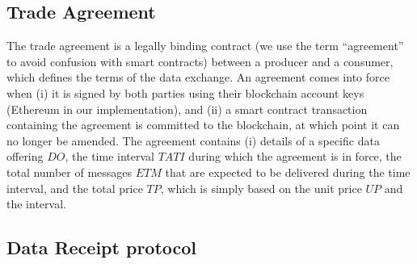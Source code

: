 \documentclass[letterpaper, 10 pt, conference]{ieeeconf}  %
\newcommand{\up}{\ensuremath{\mathit{UP}}}
\newcommand{\doff}{\ensuremath{\mathit{DO}}}
\newcommand{\tati}{\ensuremath{\mathit{TATI}}}
\newcommand{\etm}{\ensuremath{\mathit{ETM}}}
\newcommand{\tp}{\ensuremath{\mathit{TP}}}
\begin{document}
%


\subsection{Trade Agreement} \label{sec:agreement}

The trade agreement is a legally binding contract (we use the term ``agreement'' to avoid confusion with smart contracts) between a producer and a consumer, which defines the terms of the data exchange.
An agreement comes into force when (i) it is signed by both parties using their blockchain account keys (Ethereum in our implementation), and (ii) a smart contract transaction containing the agreement is committed to the blockchain, at which point it can no longer be amended.
The agreement contains (i) details of a specific data offering \doff, the time interval \tati{} during which the agreement is in force, the total number of messages \etm{} that are expected to be delivered during the time interval, and the total price \tp, which is simply based on the unit price \up{} and the interval.

%
%
%

\subsection{Data Receipt protocol}  \label{sec:protocol}
\end{document}

